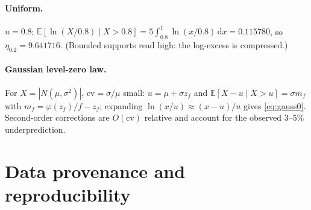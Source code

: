 \documentclass[11pt,a4paper]{article}
\theoremstyle{remark}
\newcommand{\cv}{\mathrm{cv}}
\newcommand{\dd}{\,\mathrm{d}}
\begin{document}
\paragraph{Uniform.} $u = 0.8$:
$\mathbb{E}[\ln(X/0.8) \mid X > 0.8] = 5\int_{0.8}^{1}\ln(x/0.8)\dd x = 0.115780$, so
$\eta_{0.2} = 9.641716$. (Bounded supports read high: the log-excess is compressed.)

\paragraph{Gaussian level-zero law.} For $X = |N(\mu, \sigma^2)|$, $\cv = \sigma/\mu$ small:
$u = \mu + \sigma z_f$ and
$\mathbb{E}[X - u \mid X > u] = \sigma m_f$ with $m_f = \varphi(z_f)/f - z_f$; expanding
$\ln(x/u) \approx (x - u)/u$ gives \eqref{eq:gauss0}. Second-order corrections are
$O(\cv)$ relative and account for the observed $3$--$5\%$ underprediction.

\section{Data provenance and reproducibility}\label{app:data}
\end{document}
